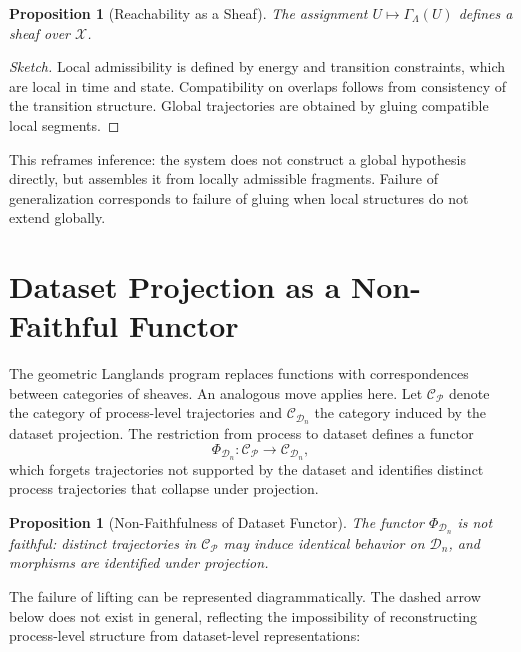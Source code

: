 \documentclass[12pt]{article}
\theoremstyle{plain}
\newtheorem{proposition}[theorem]{Proposition}
\theoremstyle{definition}
\theoremstyle{remark}
\begin{document}
\begin{proposition}[Reachability as a Sheaf]
The assignment $U \mapsto \Gamma_{\Lambda}(U)$ defines a sheaf over $\mathcal{X}$.
\end{proposition}

\begin{proof}[Sketch]
Local admissibility is defined by energy and transition constraints, which are local in time and state. Compatibility on overlaps follows from consistency of the transition structure. Global trajectories are obtained by gluing compatible local segments.
\end{proof}

This reframes inference: the system does not construct a global hypothesis directly, but assembles it from locally admissible fragments. Failure of generalization corresponds to failure of gluing when local structures do not extend globally.

\section{Dataset Projection as a Non-Faithful Functor}

The geometric Langlands program replaces functions with correspondences between categories of sheaves. An analogous move applies here. Let $\mathcal{C}_{\mathcal{P}}$ denote the category of process-level trajectories and $\mathcal{C}_{\mathcal{D}_n}$ the category induced by the dataset projection. The restriction from process to dataset defines a functor
\[
\Phi_{\mathcal{D}_n} : \mathcal{C}_{\mathcal{P}} \to \mathcal{C}_{\mathcal{D}_n},
\]
which forgets trajectories not supported by the dataset and identifies distinct process trajectories that collapse under projection.

\begin{proposition}[Non-Faithfulness of Dataset Functor]
The functor $\Phi_{\mathcal{D}_n}$ is not faithful: distinct trajectories in $\mathcal{C}_{\mathcal{P}}$ may induce identical behavior on $\mathcal{D}_n$, and morphisms are identified under projection.
\end{proposition}

The failure of lifting can be represented diagrammatically. The dashed arrow below does not exist in general, reflecting the impossibility of reconstructing process-level structure from dataset-level representations:

\begin{center}
\end{center}
\end{document}
